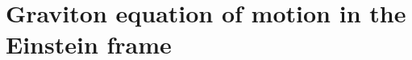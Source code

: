 \documentclass[a4paper,12pt]{article}
\begin{document}


\section{Graviton equation of motion in the Einstein frame}
\label{appendix:graviton_eom}
\end{document}
